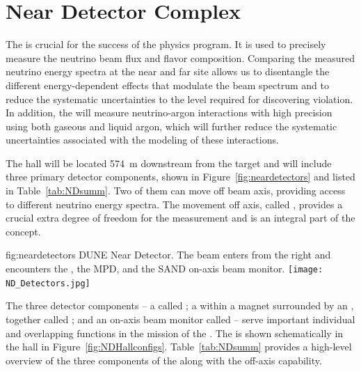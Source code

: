 \section{Near Detector Complex}
\label{sec:physics-nd-overview}

The   is crucial for the success of the  physics program. It is used to precisely measure the neutrino beam flux and flavor composition. Comparing the measured neutrino energy spectra at the near and far site allows us to disentangle the different energy-dependent effects that modulate the beam spectrum and to reduce the systematic uncertainties to the level required for discovering  violation. In addition, the  will measure neutrino-argon interactions with high precision using both gaseous and liquid argon, which will further reduce the systematic uncertainties associated with the modeling of these interactions.


The  hall will be located \SI{574}{m} downstream from the target and will include three primary detector components, shown in Figure~\ref{fig:neardetectors}  and listed in Table~\ref{tab:NDsumm}. Two of them can move off beam axis, providing access to different neutrino energy spectra. The movement off axis, called , provides a crucial extra degree of freedom for the  measurement and is an integral part of the   concept. 


\begin{dunefigure}
{fig:neardetectors}
{DUNE Near Detector. The beam enters from the right and encounters
the , the MPD, and the SAND on-axis beam monitor.}
\texttt{[image: ND\_Detectors.jpg]}
\end{dunefigure}

The three detector components -- a  called ; a  within a magnet surrounded by an , together called ; and an on-axis beam monitor called  -- serve important individual and overlapping functions in the mission of the . 
The   is shown schematically in the   hall in Figure~\ref{fig:NDHallconfigs}.  
Table~\ref{tab:NDsumm} provides a high-level overview of the three components of the   along with the off-axis capability.  

